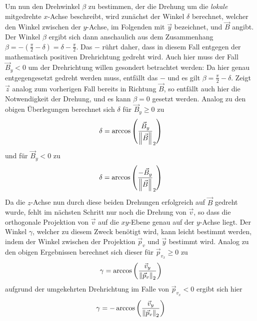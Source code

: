 Um nun den Drehwinkel \(\beta\) zu bestimmen, der die Drehung um die \textit{lokale} mitgedrehte \(x\)-Achse beschreibt, wird
zun\"achst der Winkel \(\delta\) berechnet, welcher den Winkel zwischen der \(y\)-Achse, im Folgenden mit \(\vec{y}\) bezeichnet,
und \(\vec{B}\) angibt. Der Winkel \(\beta\) ergibt sich dann anschaulich aus dem Zusammenhang
\(\beta = -\left(\frac{\pi}{2} - \delta\right) = \delta - \frac{\pi}{2}\). Das \(-\) r\"uhrt daher, dass in diesem Fall entgegen
der mathematisch positiven Drehrichtung gedreht wird. Auch hier muss der Fall \(\vec{B}_y < 0 \) um der Drehrichtung willen
gesondert betrachtet werden: Da hier genau entgegengesetzt gedreht werden muss, entf\"allt das \(-\) und es gilt
\(\beta = \frac{\pi}{2} - \delta\). Zeigt \(\vec{z}\) analog zum vorherigen Fall bereits in Richtung \(\vec{B}\), so entf\"allt auch
hier die Notwendigkeit der Drehung, und es kann \(\beta = 0\) gesetzt werden. Analog zu den obigen \"Uberlegungen berechnet sich
\(\delta\) f\"ur \(\vec{B}_y \geq 0\) zu
\begin{equation}
  \delta = \arccos{\left(\frac{\vec{B}_y}{\left\lVert\vec{B}\right\rVert}_2\right)}
\end{equation}
und f\"ur \(\vec{B}_y < 0 \) zu
\begin{equation}
  \delta = \arccos{\left(\frac{-\vec{B}_y}{\left\lVert\vec{B}\right\rVert}_2\right)}
\end{equation}
Da die \(z\)-Achse nun durch diese beiden Drehungen erfolgreich auf \(\vec{B}\) gedreht wurde, fehlt im n\"achsten Schritt nur noch
die Drehung von \(\vec{v}\), so dass die orthogonale Projektion von \(\vec{v}\) auf die \(xy\)-Ebene genau auf der \(y\)-Achse
liegt. Der Winkel \(\gamma\), welcher zu diesem Zweck ben\"otigt wird, kann leicht bestimmt werden, indem der Winkel zwischen
der Projektion \(\vec{p}_v\) und \(\vec{y}\) bestimmt wird. Analog zu den obigen Ergebnissen berechnet sich dieser f\"ur
\(\vec{p}_{v_x} \geq 0\) zu
\begin{equation}
  \gamma = \arccos{\left(\frac{\vec{v}_y}{\left\lVert\vec{p}_v\right\rVert_2}\right)}
\end{equation}
aufgrund der umgekehrten Drehrichtung im Falle von \(\vec{p}_{v_x} < 0\) ergibt sich hier
\begin{equation}
  \gamma = -\arccos{\left(\frac{\vec{v}_y}{\left\lVert\vec{p}_v\right\rVert_2}\right)}
\end{equation}


